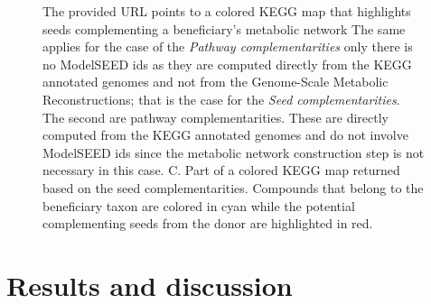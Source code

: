 \documentclass[sn-mathphys,Numbered]{sn-jnl}  %
\theoremstyle{thmstyleone}%
\theoremstyle{thmstyletwo}%
\theoremstyle{thmstylethree}%
\begin{document}
\begin{figure}[H]
{                The provided URL points to a colored KEGG map that highlights seeds complementing a beneficiary's metabolic network
                The same applies for the case of the \textit{Pathway complementarities} only there is no ModelSEED ids as they are computed directly from the KEGG annotated genomes and not from the Genome-Scale Metabolic Reconstructions; that is the case for the \textit{Seed complementarities}.
                The second are pathway complementarities. 
                These are directly computed from the KEGG annotated genomes and do not involve ModelSEED ids since the metabolic network construction step is not necessary in this case.
                C. Part of a colored KEGG map returned based on the seed complementarities. 
                Compounds that belong to the beneficiary taxon are colored in cyan while the potential complementing seeds from the donor are highlighted in red.
            }
            \label{fig:panels}
            \thispagestyle{empty} %
            \nolinenumbers %
        \end{figure}


\newpage

\section*{Results and discussion}
\label{sec:results-and-discussion}

\end{document}

